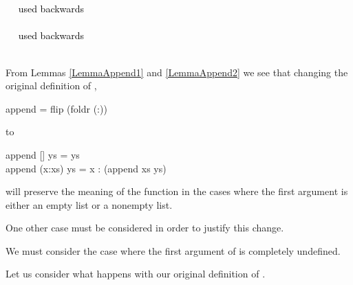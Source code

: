 \documentclass{seminar}
\begin{document}
\begin{slide}
\begin{codenott}
\\
\\
\\
\\
\\
\\
\\
\textcolor{black}{~~ used backwards}\\
\\
\textcolor{black}{~~ used backwards}\\
\\
\end{codenott}

\newslide

From Lemmas \ref{LemmaAppend1} and \ref{LemmaAppend2} we see that
changing the original definition of ,

\begin{code}
append = flip (foldr (:))
\end{code}

to

\begin{code}
append [] ys = ys\\
append (x:xs) ys = x : (append xs ys)
\end{code}

will preserve the meaning of the function in the
cases where the first argument is either an empty list or a nonempty list.

One other case must be considered in order to justify this change.

\newslide

We must consider the case where the first argument of 
is completely undefined.

Let us consider what happens with our original definition of
.

\begin{codenott}
\\
\\
\\
\\
\\
\\
\bottom
\end{codenott}


\end{slide}
\end{document}
